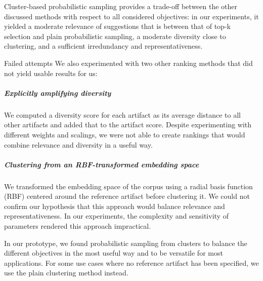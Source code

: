 Cluster-based probabilistic sampling provides a trade-off between the other discussed methods with respect to all considered objectives:
in our experiments, it yielded a moderate relevance of suggestions that is between that of top-k selection and plain probabilistic sampling, a moderate diversity close to clustering, and a sufficient irredundancy and representativeness.

\begin{genericbox}{Failed attempts}
	We also experimented with two other ranking methods that did not yield usable results for us:

	\subparagraph{Explicitly amplifying diversity}
	We computed a diversity score for each artifact as its average distance to all other artifacts and added that to the artifact score.
	Despite experimenting with different weights and scalings, we were not able to create rankings that would combine relevance and diversity in a useful way.

	\subparagraph{Clustering from an RBF-transformed embedding space}
	We transformed the embedding space of the corpus using a radial basis function (RBF) centered around the reference artifact before clustering it.
	We could not confirm our hypothesis that this approach would balance relevance and representativeness.
	In our experiments, the complexity and sensitivity of parameters rendered this approach impractical.
\end{genericbox}


In our prototype, we found probabilistic sampling from clusters to balance the different objectives in the most useful way and to be versatile for most applications.
For some use cases where no reference artifact has been specified, we use the plain clustering method instead.
